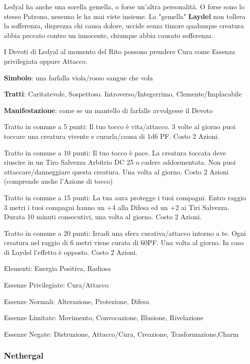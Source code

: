 \documentclass[a4paper,11pt,twoside,openany]{book}
\begin{document}
{Ledyal ha anche una sorella gemella, o forse un'altra personalità. O forse sono lo stesso Patrono, nessuno le ha mai viste insieme. La "gemella" \textbf{Laydel} non tollera la sofferenza, disprezza chi causa dolore, uccide senza timore qualunque creatura abbia peccato contro un innocente, chiunque abbia causato sofferenza.

I Devoti di Ledyal al momento del Rito possono prendere Cura come Essenza privilegiata oppure Attacco.

\textbf{Simbolo}: una farfalla viola/rosso sangue che vola

\textbf{Tratti}: Caritatevole, Sospettoso. Introverso/Integerrimo, Clemente/Implacabile

\textbf{Manifestazione}: come se un mantello di farfalle avvolgesse il Devoto

\bigskip

Tratto in comune a 5 punti: Il tuo tocco è vita/attacco. 3 volte al giorno puoi toccare una creatura vivente e curarla/causa di 1d6 PF. Costo 2 Azioni.

Tratto in comune a 10 punti: Il tuo tocco è pace. La creatura toccata deve riuscire in un Tiro Salvezza Arbitrio DC 25 o cadere addormentata. Non puoi attaccare/danneggiare questa creatura. Una volta al giorno. Costo 2 Azioni (comprende anche l'Azione di tocco)

Tratto in comune a 15 punti: La tua aura protegge i tuoi compagni. Entro raggio 3 metri i tuoi compagni hanno un +4 alla Difesa ed un +2 ai Tiri Salvezza. Durata 10 minuti consecutivi, una volta al giorno. Costo 2 Azioni.

Tratto in comune a 20 punti: Irradi una sfera curativa/attacco intorno a te. Ogni creatura nel raggio di 6 metri viene curata di 60PF. Una volta al giorno. In caso di Laydel l'effetto è opposto. Costo 2 Azioni.

\bigskip

Elementi: Energia Positiva, Radiosa

\bigskip

Essenze Privilegiate: Cura/Attacco

Essenze Normali: Alterazione, Protezione, Difesa

Essenze Limitate: Movimento, Convocazione, Illusione, Rivelazione

Essenze Negate: Distruzione, Attacco/Cura, Creazione, Trasformazione,Charm

\subsubsection{Nethergal}

}
\end{document}
